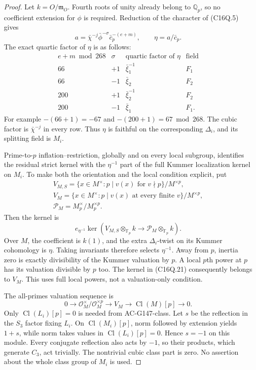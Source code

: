 \begin{proof}
Let $k=O/\mathfrak m_O$.
Fourth roots of unity already belong to $\mathbb Q_p$, so
no coefficient extension for $\phi$ is required.
Reduction of the character of (C16Q.5) gives
\[
       a=\bar\chi^{-j}\bar\phi^{-\sigma}\bar c_p^{-(e+m)},
       \qquad \eta=a/\bar c_p .
 \tag{C16Q.18}
\]
The exact quartic factor of $\eta$ is as follows:
\[
 \begin{array}{c|c|c|c}
 e+m\bmod268&\sigma&\text{quartic factor of }\eta&\text{field}\\ \hline
 66&+1&\bar\xi_1^{-1}&F_1\\
 66&-1&\bar\xi_2&F_2\\
 200&+1&\bar\xi_2^{-1}&F_2\\
 200&-1&\bar\xi_1&F_1 .
 \end{array}
 \tag{C16Q.19}
\]
For example $-(66+1)=-67$ and $-(200+1)=67\bmod268$.
The cubic factor is $\bar\chi^{-j}$ in every row.
Thus $\eta$ is faithful on the corresponding $\Delta_i$, and
its splitting field is $M_i$.

Prime-to-$p$ inflation--restriction, globally and on every local
subgroup, identifies the residual strict kernel with the
$\eta^{-1}$ part of the full Kummer localization kernel on $M_i$.
To make both the orientation and the local condition explicit, put
\[
 \begin{gathered}
 V_{M,S}=\{x\in M^\times:p\mid v(x)\text{ for }v\nmid p\}/M^{\times p},\\
 V_M=\{x\in M^\times:p\mid v(x)\text{ at every finite }v\}/M^{\times p},\\
 \mathcal P_M=M_p^\times/M_p^{\times p}.
 \end{gathered}
 \tag{C16Q.20}
\]
Then the kernel is
\[
 e_{\eta^{-1}}\ker\left(
       V_{M,S}\otimes_{\mathbb F_p}k
        \longrightarrow\mathcal P_M\otimes_{\mathbb F_p}k\right).
 \tag{C16Q.21}
\]
Over $M$, the coefficient is $k(1)$, and the extra
$\Delta_i$-twist on its Kummer cohomology is $\eta$.
Taking invariants therefore selects $\eta^{-1}$.
Away from $p$, inertia zero is exactly divisibility of the
Kummer valuation by $p$.
A local $p$th power at $p$ has its valuation divisible by $p$ too.
The kernel in (C16Q.21) consequently belongs to $V_M$.
This uses full local powers, not a valuation-only condition.

The all-primes valuation sequence is
\[
 0\longrightarrow\mathcal O_M^\times/\mathcal O_M^{\times p}
 \longrightarrow V_M\longrightarrow\operatorname{Cl}(M)[p]
 \longrightarrow0.
 \tag{C16Q.22}
\]
Only $\operatorname{Cl}(L_i)[p]=0$ is needed from AC-G147-class.
Let $s$ be the reflection in the $S_3$ factor fixing $L_i$.
On $\operatorname{Cl}(M_i)[p]$, norm followed by extension yields
$1+s$, while norm takes values in $\operatorname{Cl}(L_i)[p]=0$.
Hence $s=-1$ on this module.
Every conjugate reflection also acts by $-1$, so their products,
which generate $C_3$, act trivially.
The nontrivial cubic class part is zero.
No assertion about the whole class group of $M_i$ is used.


\end{proof}
